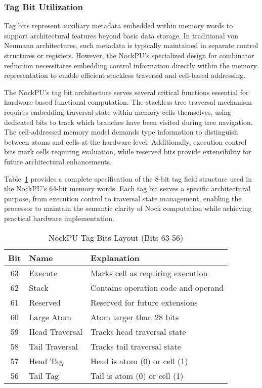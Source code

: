 \documentclass[twoside]{article}
\begin{document}
\subsubsection{Tag Bit Utilization}

Tag bits represent auxiliary metadata embedded within memory words to support architectural features beyond basic data storage. In traditional von Neumann architectures, such metadata is typically maintained in separate control structures or registers. However, the NockPU's specialized design for combinator reduction necessitates embedding control information directly within the memory representation to enable efficient stackless traversal and cell-based addressing.

The NockPU's tag bit architecture serves several critical functions essential for hardware-based functional computation. The stackless tree traversal mechanism requires embedding traversal state within memory cells themselves, using dedicated bits to track which branches have been visited during tree navigation. The cell-addressed memory model demands type information to distinguish between atoms and cells at the hardware level. Additionally, execution control bits mark cells requiring evaluation, while reserved bits provide extensibility for future architectural enhancements.

Table~\ref{tab:tag-bits} provides a complete specification of the 8-bit tag field structure used in the NockPU's 64-bit memory words. Each tag bit serves a specific architectural purpose, from execution control to traversal state management, enabling the processor to maintain the semantic clarity of Nock computation while achieving practical hardware implementation.

\begin{table}[h]
\centering
\caption{NockPU Tag Bits Layout (Bits 63-56)}
\label{tab:tag-bits}
\begin{tabular}{|c|l|p{6cm}|}
\hline
\textbf{Bit} & \textbf{Name} & \textbf{Explanation} \\
\hline
63 & Execute & Marks cell as requiring execution \\
62 & Stack & Contains operation code and operand \\
61 & Reserved & Reserved for future extensions \\
60 & Large Atom & Atom larger than 28 bits \\
59 & Head Traversal & Tracks head traversal state \\
58 & Tail Traversal & Tracks tail traversal state \\
57 & Head Tag & Head is atom (0) or cell (1) \\
56 & Tail Tag & Tail is atom (0) or cell (1) \\
\hline
\end{tabular}
\end{table}
\end{document}
